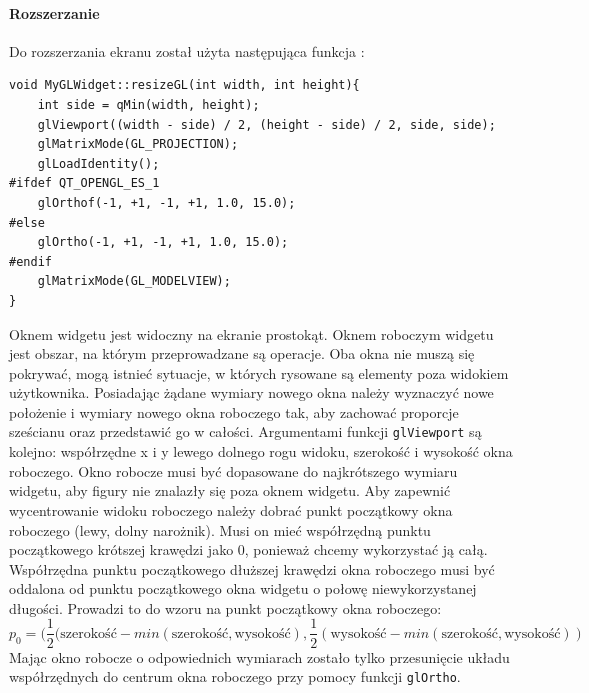 \paragraph{Rozszerzanie}
Do rozszerzania ekranu został użyta następująca funkcja\cite{Tut} :
\begin{lstlisting}
void MyGLWidget::resizeGL(int width, int height){
    int side = qMin(width, height);
    glViewport((width - side) / 2, (height - side) / 2, side, side);
    glMatrixMode(GL_PROJECTION);
    glLoadIdentity();
#ifdef QT_OPENGL_ES_1
    glOrthof(-1, +1, -1, +1, 1.0, 15.0);
#else
    glOrtho(-1, +1, -1, +1, 1.0, 15.0);
#endif
    glMatrixMode(GL_MODELVIEW);
}
\end{lstlisting}
Oknem widgetu jest widoczny na ekranie prostokąt. Oknem roboczym widgetu jest obszar, na którym przeprowadzane są operacje. Oba okna nie muszą się pokrywać, mogą istnieć sytuacje, w których rysowane są elementy poza widokiem użytkownika. Posiadając żądane wymiary nowego okna należy wyznaczyć nowe położenie i wymiary nowego okna roboczego tak, aby zachować proporcje sześcianu oraz przedstawić go w całości. Argumentami funkcji \texttt{glViewport} są kolejno: współrzędne x i y lewego dolnego rogu widoku, szerokość i wysokość okna roboczego. Okno robocze musi być dopasowane do najkrótszego wymiaru widgetu, aby figury nie znalazły się poza oknem widgetu. Aby zapewnić wycentrowanie widoku roboczego należy dobrać punkt początkowy okna roboczego (lewy, dolny narożnik). Musi on mieć współrzędną punktu początkowego krótszej krawędzi jako 0, ponieważ chcemy wykorzystać ją całą. Współrzędna punktu początkowego dłuższej krawędzi okna roboczego musi być oddalona od punktu początkowego okna widgetu o połowę niewykorzystanej długości. Prowadzi to do wzoru na punkt początkowy okna roboczego: 
\begin{equation}
p_0=(\frac{1}{2}(\text{szerokość}-min(\text{szerokość}, \text{wysokość}),\frac{1}{2}(\text{wysokość}-min(\text{szerokość}, \text{wysokość}))
\end{equation}
Mając okno robocze o odpowiednich wymiarach zostało tylko przesunięcie układu współrzędnych do centrum okna roboczego przy pomocy funkcji \texttt{glOrtho}.
